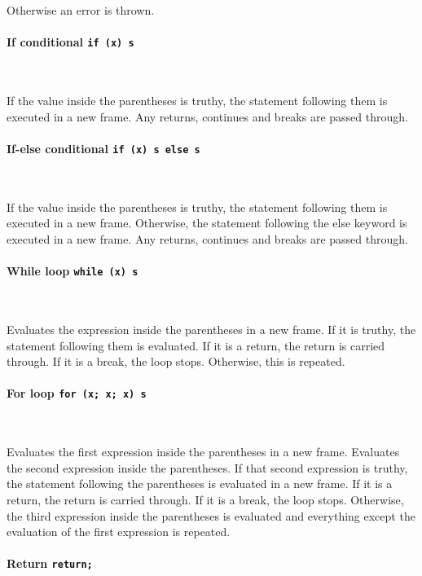 Otherwise an error is thrown.

\paragraph{If conditional \quad \texttt{if (x) s} } \

If the value inside the parentheses is truthy, the statement following them is executed in a new frame. Any returns, continues and breaks are passed through.

\paragraph{If-else conditional \quad \texttt{if (x) s else s} } \

If the value inside the parentheses is truthy, the statement following them is executed in a new frame. Otherwise, the statement following the else keyword is executed in a new frame. Any returns, continues and breaks are passed through.

\paragraph{While loop \quad \texttt{while (x) s}} \

Evaluates the expression inside the parentheses in a new frame. If it is truthy, the statement following them is evaluated. If it is a return, the return is carried through. If it is a break, the loop stops. Otherwise, this is repeated.

\paragraph{For loop \quad \texttt{for (x; x; x) s}} \

Evaluates the first expression inside the parentheses in a new frame. Evaluates the second expression inside the parentheses. If that second expression is truthy, the statement following the parentheses is evaluated in a new frame. If it is a return, the return is carried through. If it is a break, the loop stops. Otherwise, the third expression inside the parentheses is evaluated and everything except the evaluation of the first expression is repeated.

\paragraph{Return \quad \texttt{return;}} \

